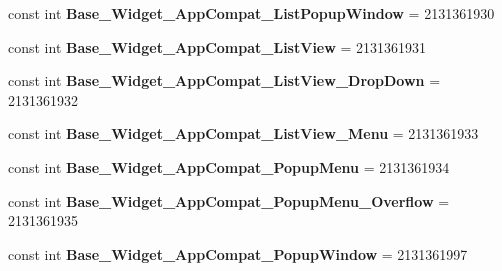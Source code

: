 \begin{DoxyCompactItemize}
\item 
\mbox{\label{class_sample_app_1_1_droid_1_1_resource_1_1_style_ac7e87083e5537d630a2ab0160ba63f83}} 
const int {\bfseries Base\+\_\+\+Widget\+\_\+\+App\+Compat\+\_\+\+List\+Popup\+Window} = 2131361930
\item 
\mbox{\label{class_sample_app_1_1_droid_1_1_resource_1_1_style_a2ce56f62218d379814615d4e386d5ea3}} 
const int {\bfseries Base\+\_\+\+Widget\+\_\+\+App\+Compat\+\_\+\+List\+View} = 2131361931
\item 
\mbox{\label{class_sample_app_1_1_droid_1_1_resource_1_1_style_ac00c7014d35905df8945ea4fc7ce9129}} 
const int {\bfseries Base\+\_\+\+Widget\+\_\+\+App\+Compat\+\_\+\+List\+View\+\_\+\+Drop\+Down} = 2131361932
\item 
\mbox{\label{class_sample_app_1_1_droid_1_1_resource_1_1_style_a5fe93bcbb0d0789c37a64e15185d1767}} 
const int {\bfseries Base\+\_\+\+Widget\+\_\+\+App\+Compat\+\_\+\+List\+View\+\_\+\+Menu} = 2131361933
\item 
\mbox{\label{class_sample_app_1_1_droid_1_1_resource_1_1_style_a10c870d551ed342f4bf234c5ef8fe119}} 
const int {\bfseries Base\+\_\+\+Widget\+\_\+\+App\+Compat\+\_\+\+Popup\+Menu} = 2131361934
\item 
\mbox{\label{class_sample_app_1_1_droid_1_1_resource_1_1_style_acee52fbf13d1d0af708dd63ff02abec6}} 
const int {\bfseries Base\+\_\+\+Widget\+\_\+\+App\+Compat\+\_\+\+Popup\+Menu\+\_\+\+Overflow} = 2131361935
\item 
\mbox{\label{class_sample_app_1_1_droid_1_1_resource_1_1_style_a988022a49c43d2a01488b3674fb50c49}} 
const int {\bfseries Base\+\_\+\+Widget\+\_\+\+App\+Compat\+\_\+\+Popup\+Window} = 2131361997
\item 
\mbox{\label{class_sample_app_1_1_droid_1_1_resource_1_1_style_afbe95766c906b23c5e14642dc6b95d67}} 

\end{DoxyCompactItemize}
